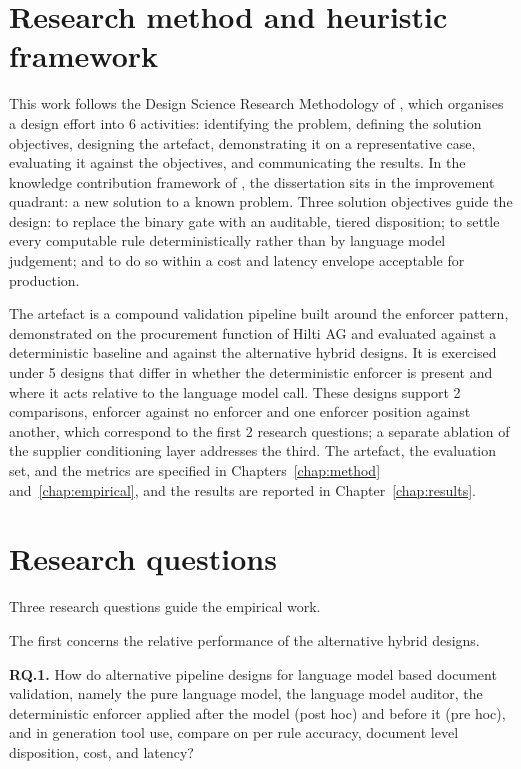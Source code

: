 \section{Research method and heuristic framework}
\label{sec:intro:method}

This work follows the Design Science Research Methodology of \citet{peffers2007dsrm}, which organises a design effort into 6 activities: identifying the problem, defining the solution objectives, designing the artefact, demonstrating it on a representative case, evaluating it against the objectives, and communicating the results. In the knowledge contribution framework of \citet{gregor2013dsr}, the dissertation sits in the improvement quadrant: a new solution to a known problem. Three solution objectives guide the design: to replace the binary gate with an auditable, tiered disposition; to settle every computable rule deterministically rather than by language model judgement; and to do so within a cost and latency envelope acceptable for production.

The artefact is a compound validation pipeline built around the enforcer pattern, demonstrated on the procurement function of Hilti AG and evaluated against a deterministic baseline and against the alternative hybrid designs. It is exercised under 5 designs that differ in whether the deterministic enforcer is present and where it acts relative to the language model call. These designs support 2 comparisons, enforcer against no enforcer and one enforcer position against another, which correspond to the first 2 research questions; a separate ablation of the supplier conditioning layer addresses the third. The artefact, the evaluation set, and the metrics are specified in Chapters~\ref{chap:method} and~\ref{chap:empirical}, and the results are reported in Chapter~\ref{chap:results}.


\section{Research questions}
\label{sec:intro:rqs}

Three research questions guide the empirical work.

The first concerns the relative performance of the alternative hybrid designs.

\textbf{RQ.1.} How do alternative pipeline designs for language model based document validation, namely the pure language model, the language model auditor, the deterministic enforcer applied after the model (post hoc) and before it (pre hoc), and in generation tool use, compare on per rule accuracy, document level disposition, cost, and latency?

